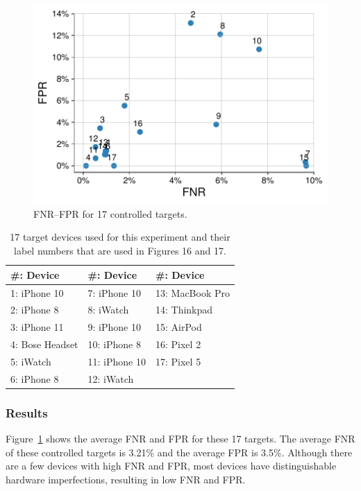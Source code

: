 \begin{figure}[t!]
    \centering
    \includegraphics[width = \linewidth]{bletracking/plots/fpr_fnr2.pdf} 
    \caption{FNR--FPR for 17 controlled targets.}
    \label{fig:fpr_fnr}
\end{figure}

\begin{table}
    \centering
    \begin{tabular}{|l|l|l|}
    \hline
    \#: Device&\#: Device&\#: Device\\ \hline
    1: iPhone 10&7: iPhone 10&13: MacBook Pro\\ 
    2: iPhone 8&8: iWatch&14: Thinkpad\\ 
    3: iPhone 11&9: iPhone 10&15: AirPod\\ 
    4: Bose Headset&10: iPhone 8&16: Pixel 2\\ 
    5: iWatch&11: iPhone 10&17: Pixel 5\\ 
    6: iPhone 8&12: iWatch& \\ \hline
    \end{tabular}
    \caption{17 target devices used for this experiment and their label numbers that are used in Figures 16 and 17.}
    \label{tab:targets}
\end{table}

\subsubsection*{Results}

Figure~\ref{fig:fpr_fnr} shows the average FNR and FPR for these 17 targets. The average FNR of these controlled targets is 3.21\% and the average FPR is 3.5\%. Although there are a few devices with high FNR and FPR, most devices have distinguishable hardware imperfections, resulting in low FNR and FPR.

